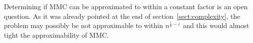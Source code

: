 



Determining if MMC can be approximated to within a constant factor is an open question. As it was already pointed at the end of section~\ref{sect:complexity}, the problem may possibly be not approximable to within $n^{\frac{1}{2}-\varepsilon}$ and this would almost tight the approximability of MMC.

